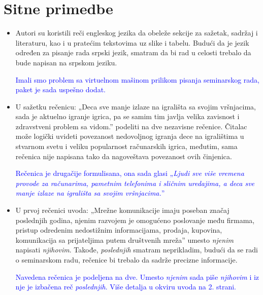 \documentclass[a4paper]{report}
\newcommand{\odgovor}[1]{\textcolor{blue}{#1}}
\begin{document}
\section{Sitne primedbe}
\begin{itemize}
    \item Autori su koristili reči engleskog jezika da obeleže sekcije za sažetak, sadržaj i literaturu, kao i u pratećim tekstovima uz slike i tabelu. Budući da je jezik određen za pisanje rada srpski jezik, smatram da bi rad u celosti trebalo da bude napisan na srpskom jeziku. 
    
    \odgovor{Imali smo problem sa virtuelnom mašinom prilikom pisanja seminarskog rada, paket je sada uspešno dodat.}
\end{itemize}
\begin{itemize}
    \item U sažetku rečenicu: \newline
    „Deca sve manje izlaze na igrališta sa svojim vršnjacima, sada je aktuelno igranje igrica, pa se samim tim javlja velika zavisnost i zdravstveni problem sa vidom.”\newline
    podeliti na dve nezavisne rečenice. Čitalac može logički uvideti povezanost nedovoljnog igranja dece na igralištima u stvarnom svetu i veliku popularnost računarskih igrica, međutim, sama rečenica nije napisana tako da nagoveštava povezanost ovih činjenica. 
   
    \odgovor{Rečenica je drugačije formulisana, ona sada glasi „\textit{Ljudi sve više vremena provode za računarima, pametnim telefonima i sličnim uredajima, a deca sve manje izlaze na igrališta sa
    	svojim vršnjacima.}”}
\end{itemize}
\begin{itemize}
    \item U prvoj rečenici uvoda:\newline
    „Mrežne komunikacije imaju poseban značaj poslednjih godina, njenim razvojem je omogućeno poslovanje među firmama, pristup odredenim nedostižnim informacijama, prodaja, kupovina, komunikacija sa prijateljima putem društvenih mreža”\newline
    umesto \textit{njenim} napisati \textit{njihovim}. Takođe, \textit{poslednjih} smatram neprikladim, budući da se radi o seminarskom radu, rečenice bi trebalo da sadrže precizne informacije. 
   
    \odgovor{Navedena rečenica je podeljena na dve. Umesto \textit{njenim} sada piše \textit{njihovim} i iz nje je izbačena reč \textit{poslednjih}. Više detalja u okviru uvoda na 2. strani. }
\end{itemize}
\end{document}
